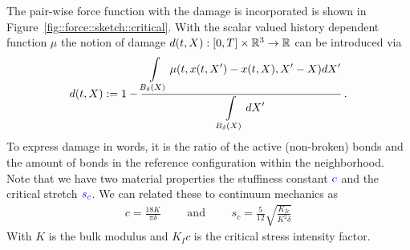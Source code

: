 The pair-wise force function with the damage is incorporated is shown in Figure~\ref{fig::force::sketch::critical}.
With the scalar valued history dependent function $\mu$ the notion of damage $d(t,X):[0,T]\times\mathbb{R}^3\rightarrow\mathbb{R}$ can be introduced via
\begin{align}
d(t,X):= 1- \frac{\displaystyle\int\limits_{B_\delta(X)}\mu(t,x(t,X')-x(t,X),X'-X) dX'}{\displaystyle\int\limits_{B_\delta(X)}dX'}\,\text{.}
\label{eq::damage:nodal}
\end{align}
To express damage in words, it is the ratio of the active (non-broken) bonds and the amount of bonds in the reference configuration within the neighborhood. Note that we have two material properties the stuffiness constant $\textcolor{blue}{c}$ and the critical stretch $\textcolor{blue}{s_c}$. We can related these to continuum mechanics as
\begin{align}
c = \frac{18K}{\pi\delta} \qquad \text{ and } \qquad s_c = \frac{5}{12} \sqrt{\frac{K_{Ic}}{K^2\delta}}
\end{align}
With $K$ is the bulk modulus and $K_Ic$ is the critical stress intensity factor.



